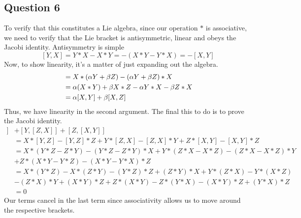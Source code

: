 \subsection{Question 6} 
To verify that this constitutes a Lie algebra, since our operation $ * $ is associative, we need to verify that the Lie bracket is antisymmetric, linear and obeys the Jacobi identity. Antisymmetry is simple
\[ 
 	[ Y , X ] = Y * X - X * Y  =  - ( X* Y - Y *X )  = - [ X, Y ] \] Now, to show linearity, it's a matter of just expanding out the algebra. 
\begin{align*} 
	[ X, \al Y + \be Z ] & = X * ( \al Y + \be Z )  - ( \al Y + \be Z ) * X \\
				& = \alpha ( X * Y ) + \be X * Z - \al Y * X  - \be Z * X \\
				&= \al [ X, Y ] + \be [X, Z ] 
\end{align*} Thus, we have linearity in the second argument. The final this to do is to prove the Jacobi identity.
\begin{align*} 
	 [ X , [ Y , Z] ] & + [ Y , [ Z, X ]] + [ Z, [ X, Y ]] \\
	  & = X * [ Y , Z ]  - [ Y , Z ] *Z + Y * [ Z, X ] - [ Z, X] * Y + Z * [ X, Y ]  - [ X, Y ] * Z \\
	& = X * ( Y * Z - Z * Y )  - ( Y * Z - Z * Y ) * X + Y * ( Z * X - X * Z )   - ( Z  * X - X * Z ) * Y \\
	& +  Z* ( X * Y - Y * Z ) - ( X * Y - Y * X ) * Z \\
	 &  = X * ( Y * Z ) - X * ( Z * Y ) - ( Y * Z ) * Z + ( Z * Y ) * X + Y * ( Z * X ) - Y * ( X * Z ) \\
	 & - ( Z* X ) * Y + ( X* Y ) * Z + Z * ( X * Y  )  - Z * ( Y * X ) - ( X * Y ) * Z + ( Y * X ) * Z \\
	 & = 0 
\end{align*}
Our terms cancel in the last term since associativity allows us to move around the respective brackets. 

\pagebreak 
